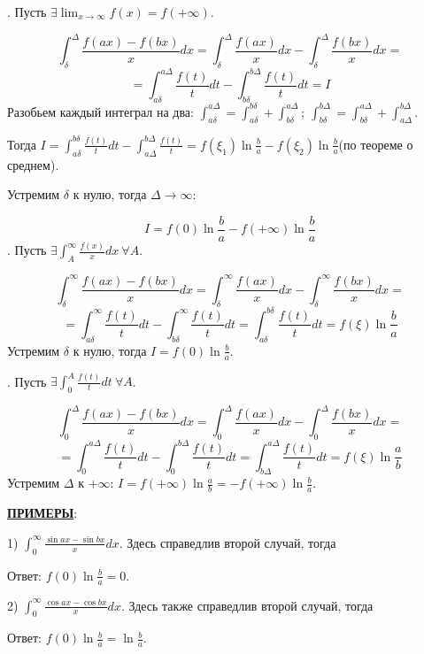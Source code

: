 \documentclass[12pt]{article}
\begin{document}
. Пусть $\exists \lim_{x\to \infty} f(x) = f(+\infty)$.\par
$$\int_{\delta}^{\Delta} \frac{f(ax)-f(bx)}{x} dx = \int_{\delta}^{\Delta} \frac{f(ax)}{x} dx - \int_{\delta}^{\Delta} \frac{f(bx)}{x} dx =$$
$$=\int_{a\delta}^{a\Delta} \frac{f(t)}{t} dt - \int_{b\delta}^{b\Delta} \frac{f(t)}{t} dt = I$$
Разобьем каждый интеграл на два: $\int_{a\delta}^{a\Delta} = \int_{a\delta}^{b\delta} + \int_{b\delta}^{a\Delta}; \ \int_{b\delta}^{b\Delta} = \int_{b\delta}^{a\Delta} + \int_{a\Delta}^{b\Delta}$.\par
Тогда $I = \int_{a\delta}^{b\delta} \frac{f(t)}{t} dt - \int_{a\Delta}^{b\Delta} \frac{f(t)}{t} = f(\xi_1) \ln{\frac{b}{a}} - f(\xi_2) \ln{\frac{b}{a}}$(по теореме о среднем).\par
Устремим $\delta$ к нулю, тогда $\Delta \to \infty$:\par
$$I = f(0) \ln{\frac{b}{a}} - f(+\infty)\ln{\frac{b}{a}}$$
. Пусть $\exists \int_A^{\infty} \frac{f(x)}{x} dx \ \forall A$.\par
$$\int_{\delta}^{\infty} \frac{f(ax) - f(bx)}{x} dx = \int_{\delta}^{\infty} \frac{f(ax)}{x} dx - \int_{\delta}^{\infty} \frac{f(bx)}{x} dx =$$
$$= \int_{a\delta}^{\infty} \frac{f(t)}{t} dt - \int_{b\delta}^{\infty} \frac{f(t)}{t} dt = \int_{a\delta}^{b\delta} \frac{f(t)}{t} dt = f(\xi) \ln{\frac{b}{a}}$$
Устремим $\delta$ к нулю, тогда $I = f(0) \ln{\frac{b}{a}}$.\par
{}. Пусть $\exists \int_0^A \frac{f(t)}{t} dt \ \forall A$.\par
$$\int_0^{\Delta} \frac{f(ax)-f(bx)}{x} dx = \int_0^{\Delta} \frac{f(ax)}{x} dx - \int_0^{\Delta} \frac{f(bx)}{x} dx =$$
$$= \int_0^{a\Delta} \frac{f(t)}{t} dt - \int_0^{b\Delta} \frac{f(t)}{t} dt = \int_{b\Delta}^{a\Delta} \frac{f(t)}{t} dt = f(\xi) \ln{\frac{a}{b}}$$
Устремим $\Delta$ к $+\infty$: $I = f(+\infty) \ln{\frac{a}{b}} = -f(+\infty)\ln{\frac{b}{a}}$.\par
\uline{\textbf{ПРИМЕРЫ}}:\par
1) $\int_0^\infty \frac{\sin{ax}-\sin{bx}}{x} dx$. Здесь справедлив второй случай, тогда\par
Ответ: $f(0) \ln{\frac{b}{a}} = 0$.\par
2) $\int_0^\infty \frac{\cos{ax}-\cos{bx}}{x} dx$. Здесь также справедлив второй случай, тогда\par
Ответ: $f(0) \ln{\frac{b}{a}} = \ln{\frac{b}{a}}$.\par
\end{document}
